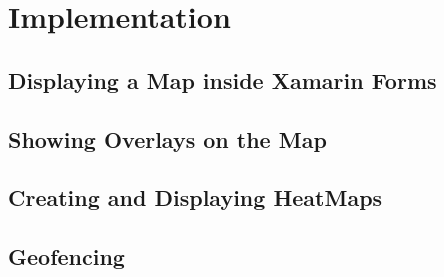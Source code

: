 \section{Implementation}

\subsection{Displaying a Map inside Xamarin Forms}

\subsection{Showing Overlays on the Map}

\subsection{Creating and Displaying HeatMaps}

\subsection{Geofencing}
